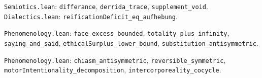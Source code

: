 \documentclass[11pt,oneside]{book}
\theoremstyle{plain}
\theoremstyle{definition}
\theoremstyle{remark}
\begin{document}
\begin{description}[style=nextline]
\item[Derrida]
  \texttt{Semiotics.lean}: \texttt{differance},
  \texttt{derrida\_trace},
  \texttt{supplement\_void}.
  \texttt{Dialectics.lean}: \texttt{reificationDeficit\_eq\_aufhebung}.

\item[Levinas]
  \texttt{Phenomenology.lean}: \texttt{face\_excess\_bounded},
  \texttt{totality\_plus\_infinity},
  \texttt{saying\_and\_said},
  \texttt{ethicalSurplus\_lower\_bound},
  \texttt{substitution\_antisymmetric}.

\item[Merleau-Ponty]
  \texttt{Phenomenology.lean}: \texttt{chiasm\_antisymmetric},
  \texttt{reversible\_symmetric},
  \texttt{motorIntentionality\_decomposition},
  \texttt{intercorporeality\_cocycle}.
\end{description}
\end{document}

